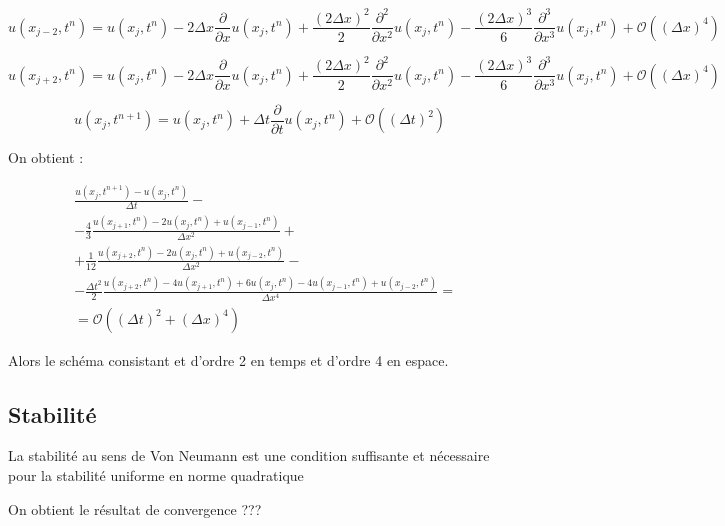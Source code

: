 \documentclass[a4paper,11pt]{article}
\begin{document}
\begin{equation*}
    u(x_{j-2}, t^{n}) =
    u(x_{j}, t^{n})
     - 2\Delta x \frac{\partial}{\partial x}u(x_{j}, t^{n})
     + \frac{(2\Delta x)^{2}}{2} \frac{\partial^{2}}{\partial x^{2}}u(x_{j}, t^{n})
     - \frac{(2\Delta x)^{3}}{6} \frac{\partial^{3}}{\partial x^{3}}u(x_{j}, t^{n})
     + \mathcal{O}((\Delta x)^{4})
\end{equation*}

\begin{equation*}
    u(x_{j+2}, t^{n}) =
    u(x_{j}, t^{n})
     - 2\Delta x \frac{\partial}{\partial x}u(x_{j}, t^{n})
     + \frac{(2\Delta x)^{2}}{2} \frac{\partial^{2}}{\partial x^{2}}u(x_{j}, t^{n})
     - \frac{(2\Delta x)^{3}}{6} \frac{\partial^{3}}{\partial x^{3}}u(x_{j}, t^{n})
     + \mathcal{O}((\Delta x)^{4})
\end{equation*}

\begin{equation*}
    u(x_{j}, t^{n+1}) =
    u(x_{j}, t^{n})    
     + \Delta t \frac{\partial}{\partial t}u(x_{j}, t^{n})
     + \mathcal{O}((\Delta t)^{2})
\end{equation*}

On obtient :

\begin{align*}
    & \frac{u(x_{j}, t^{n+1}) - u(x_{j}, t^{n})}{\Delta t} - \\
    & -\frac{4}{3} \frac{u(x_{j+1}, t^{n}) - 2u(x_{j}, t^{n}) + u(x_{j-1}, t^{n})}{\Delta x^{2}} + \\
    & +\frac{1}{12} \frac{u(x_{j+2}, t^{n}) - 2u(x_{j}, t^{n}) + u(x_{j-2}, t^{n})}{\Delta x^{2}} - \\
    & -\frac{\Delta t^{2}}{2} \frac{u(x_{j+2}, t^{n}) - 4u(x_{j+1}, t^{n}) + 6u(x_{j}, t^{n})  - 4u(x_{j-1}, t^{n}) + u(x_{j-2}, t^{n})}{\Delta x^{4}} = \\
   & = \mathcal{O}((\Delta t)^{2} + (\Delta x)^{4})
\end{align*}

Alors le schéma consistant et d'ordre 2 en temps et d'ordre 4 en espace.

\subsection{Stabilité}
La stabilité au sens de Von Neumann est une condition suffisante et nécessaire pour la stabilité uniforme en norme quadratique

On obtient le résultat de convergence ???

\subsection{}
\end{document}
